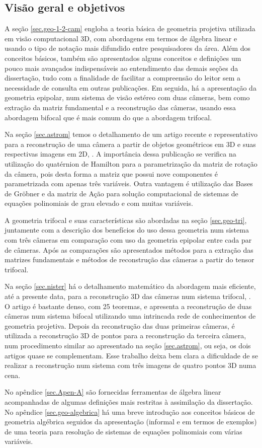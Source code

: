 \subsection*{Visão geral e objetivos}

A seção \ref{sec.geo-1-2-cam} engloba a teoria básica de geometria projetiva utilizada em visão computacional 3D, com abordagens em termos de álgebra linear e usando o tipo de notação mais difundido entre pesquisadores da área. Além dos conceitos básicos, também são apresentados alguns conceitos e definições um pouco mais avançados indispensáveis ao entendimento das demais seções da dissertação, tudo com a finalidade de facilitar a compreensão do leitor sem a necessidade de consulta em outras publicações. Em seguida, há a apresentação da geometria epipolar, num sistema de visão estéreo com duas câmeras, bem como extração da matriz fundamental e a reconstrução das câmeras, usando essa abordagem bifocal que é mais comum do que a abordagem trifocal.

Na seção \ref{sec.astrom} temos o detalhamento de um artigo recente e representativo para a reconstrução de uma câmera a partir de objetos geométricos em 3D e suas respectivas imagens em 2D, \citep{bib:kuang}. A importância dessa publicação se verifica na utilização do quatérnion de Hamilton para a parametrização da matriz de rotação da câmera, pois desta forma a matriz que possui nove componentes é parametrizada com apenas três variáveis. Outra vantagem é utilização das Bases de Gr\"obner e da matriz de Ação para solução computacional de sistemas de equações polinomiais de grau elevado e com muitas variáveis.

A geometria trifocal e suas características são abordadas na seção \ref{sec.geo-tri}, juntamente com a descrição dos benefícios do uso dessa geometria num sistema com três câmeras em comparação com uso da geometria epipolar entre cada par de câmeras. Após as comparações são apresentados métodos para a extração das matrizes fundamentais e métodos de reconstrução das câmeras a partir do tensor trifocal.  

Na seção \ref{sec.nister} há o detalhamento matemático da abordagem mais eficiente, até a presente data, para a reconstrução 3D das câmeras num sistema trifocal, \citep{2503343}. O artigo é bastante denso, com 25 teoremas, e apresenta a reconstrução de duas câmeras num sistema bifocal utilizando uma intrincada rede de conhecimentos de geometria projetiva. Depois da reconstrução das duas primeiras câmeras, é utilizada a reconstrução 3D de pontos para a reconstrução da terceira câmera, num procedimento similar ao apresentado na seção \ref{sec.astrom}, ou seja, os dois artigos quase se complementam. Esse trabalho deixa bem clara a dificuldade de se realizar a reconstrução num sistema com três imagens de quatro pontos 3D numa cena.

No apêndice \ref{sec.Apen-A} são fornecidas ferramentas de álgebra linear acompanhadas de algumas definições mais restritas à assimilação da dissertação. No apêndice \ref{sec.geo-algebrica} há uma breve introdução aos conceitos básicos de geometria algébrica seguidos da apresentação (informal e em termos de exemplos) de uma teoria para resolução de sistemas de equações polinomiais com várias variáveis.

